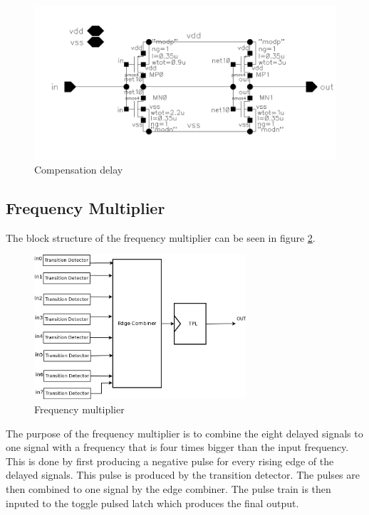 \documentclass[a4paper,12pt]{article} \usepackage{graphicx}
\begin{document}
\begin{figure}[h]
        \centering
        \includegraphics[width=150mm]{../Bilder/LD_tran/compensation_delay.png}
        \caption{Compensation delay}
        \label{fig:c_delay}
\end{figure}

\clearpage
\subsection{Frequency Multiplier}
The block structure of the frequency multiplier can be seen in figure 
\ref{fig:freq_mult}.
\begin{figure}[p]
        \centering
        \includegraphics[width=0.7\textwidth]{../Bilder/freq_mult_trans.png}
        \caption{Frequency multiplier}
        \label{fig:freq_mult}
\end{figure}

The purpose of the frequency multiplier is to combine the eight delayed signals
to one signal with a frequency that is four times bigger than the input
frequency. This is done by first producing a negative pulse for every rising
edge of the delayed signals. This pulse is produced by the transition detector.
The pulses are then combined to one signal by the edge combiner. The pulse
train is then inputed to the toggle pulsed latch which produces the final output.
\end{document}
